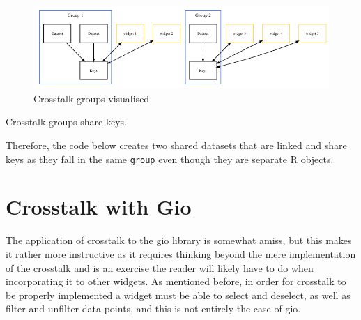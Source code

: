 \documentclass[10pt,]{krantz}
\makeatletter
\newenvironment{Shaded}{\begin{snugshade}}{\end{snugshade}}
\newcommand{\DataTypeTok}[1]{\textcolor[rgb]{0.27,0.27,0.27}{#1}}
\newcommand{\KeywordTok}[1]{\textcolor[rgb]{0.27,0.27,0.27}{\textbf{#1}}}
\newcommand{\NormalTok}[1]{#1}
\newcommand{\OperatorTok}[1]{\textcolor[rgb]{0.43,0.43,0.43}{\textbf{#1}}}
\newcommand{\StringTok}[1]{\textcolor[rgb]{0.5,0.5,0.5}{#1}}
\newenvironment{kframe}{%
\medskip{}
\setlength{\fboxsep}{.8em}
 \def\at@end@of@kframe{}%
 \ifinner\ifhmode%
  \def\at@end@of@kframe{\end{minipage}}%
  \begin{minipage}{\columnwidth}%
 \fi\fi%
 \def\FrameCommand##1{\hskip\@totalleftmargin \hskip-\fboxsep
 \colorbox{shadecolor}{##1}\hskip-\fboxsep
     \hskip-\linewidth \hskip-\@totalleftmargin \hskip\columnwidth}%
 \MakeFramed {\advance\hsize-\width
   \@totalleftmargin\z@ \linewidth\hsize
   \@setminipage}}%
 {\par\unskip\endMakeFramed%
 \at@end@of@kframe}
\renewenvironment{Shaded}{\begin{kframe}}{\end{kframe}}
\newenvironment{rmdblock}[1]
  {
  \begin{itemize}
  \renewcommand{\labelitemi}{
    \raisebox{-.7\height}[0pt][0pt]{
      {\setkeys{Gin}{width=3em,keepaspectratio}\texttt{[image: images/\#1]}}
    }
  }
  \setlength{\fboxsep}{1em}
  \begin{kframe}
  \item
  }
  {
  \end{kframe}
  \end{itemize}
  }
\newenvironment{rmdnote}
  {\begin{rmdblock}{note}}
  {\end{rmdblock}}
\makeatother
\begin{document}
\begin{figure}[H]

{\centering \includegraphics[width=1\linewidth]{images/03-crosstalk-grps} 

}

\caption{Crosstalk groups visualised}\label{fig:crosstalk-groups-diagram}
\end{figure}

\begin{rmdnote}
Crosstalk groups share keys.
\end{rmdnote}

Therefore, the code below creates two shared datasets that are linked and share keys as they fall in the same \texttt{group} even though they are separate R objects.

\begin{Shaded}
\end{Shaded}

\hypertarget{linking-widgets-gio}{%
\section{Crosstalk with Gio}\label{linking-widgets-gio}}

The application of crosstalk to the gio library is somewhat amiss, but this makes it rather more instructive as it requires thinking beyond the mere implementation of the crosstalk and is an exercise the reader will likely have to do when incorporating it to other widgets. As mentioned before, in order for crosstalk to be properly implemented a widget must be able to select and deselect, as well as filter and unfilter data points, and this is not entirely the case of gio.
\end{document}
